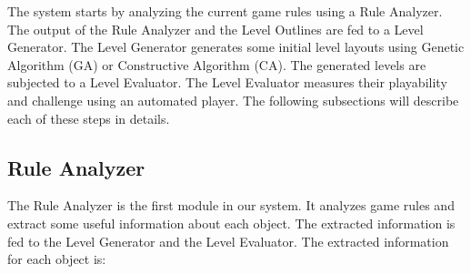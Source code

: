 \documentclass[letterpaper]{article}
\begin{document}
The system starts by analyzing the current game rules using a Rule Analyzer. The output of the Rule Analyzer and the Level Outlines are fed to a Level Generator. The Level Generator generates some initial level layouts using Genetic Algorithm (GA) or Constructive Algorithm (CA). The generated levels are subjected to a Level Evaluator. The Level Evaluator measures their playability and challenge using an automated player. The following subsections will describe each of these steps in details.

\subsection{Rule Analyzer}
The Rule Analyzer is the first module in our system. It analyzes game rules and extract some useful information about each object. The extracted information is fed to the Level Generator and the Level Evaluator. The extracted information for each object is:
\end{document}
